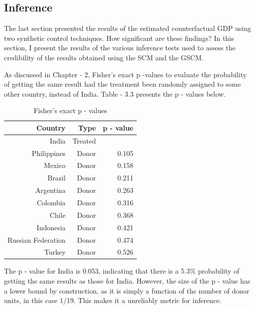 \documentclass[12pt,nobind, a4paper]{reedthesis}
\begin{document}
 \hypertarget{inference-1}{%
 \subsection{Inference}\label{inference-1}}

 The last section presented the results of the estimated counterfactual GDP using two synthetic control techniques. How significant are these findings? In this section, I present the results of the various inference tests used to assess the credibility of the results obtained using the SCM and the GSCM.
 \linebreak

 As discussed in Chapter - 2, Fisher's exact p -values to evaluate the probability of getting the same result had the treatment been randomly assigned to some other country, instead of India. Table - 3.3 presents the p - values below.
 \begin{table}[h!!]
 \centering
 \begin{tabular}{rrr}
 \hline
 Country& Type & p - value\\
 \hline
 India & Treated & \B 0.053\\
 \hline
 Philippines & Donor & 0.105\\
 \hline
 Mexico & Donor & 0.158\\
 \hline
 Brazil & Donor & 0.211\\
 \hline
 Argentina & Donor & 0.263\\
 \hline
 Colombia & Donor & 0.316\\
 \hline
 Chile & Donor & 0.368\\
 \hline
 Indonesia & Donor & 0.421\\
 \hline
 Russian Federation & Donor & 0.474\\
 \hline
 Turkey & Donor & 0.526\\
 \hline
 \end{tabular}
 \caption{Fisher's exact p - values}
 \end{table}
 The p - value for India is 0.053, indicating that there is a 5.3\% probability of getting the same results as those for India. However, the size of the p - value has a lower bound by construction, as it is simply a function of the number of donor units, in this case 1/19. This makes it a unreliably metric for inference.
 \newpage
\end{document}
